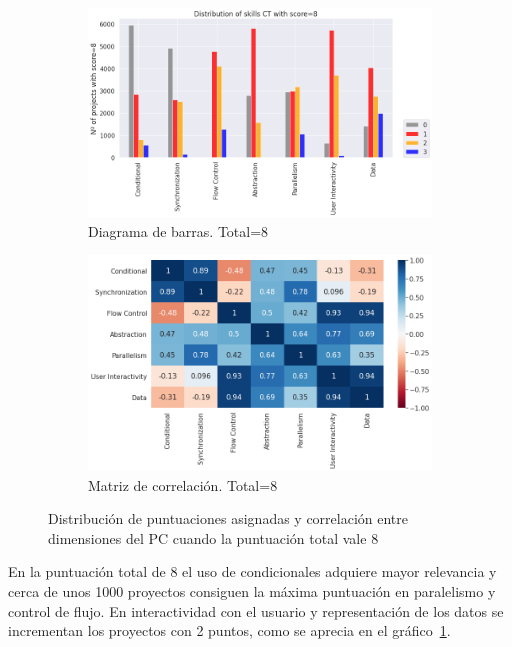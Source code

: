 \documentclass[a4paper, 12pt]{book}
\begin{document}
\begin{figure}[H]
    \centering
    \begin{subfigure}[h]{.49\textwidth} 
        \includegraphics[width=\textwidth]{img/distribucion_8_Snap}
        \caption{Diagrama de barras. Total=8}
        \label{fig:total8_Snap}
    \end{subfigure}       
    \begin{subfigure}[h]{.49\textwidth} 
        \includegraphics[width=\textwidth]{img/corr_8_Snap}
        \caption{Matriz de correlación. Total=8}
        \label{fig:corr8_Snap}
    \end{subfigure}
    \caption{Distribución de puntuaciones asignadas y correlación entre dimensiones del PC cuando la puntuación total vale 8}
\end{figure}

En la puntuación total de 8 el uso de condicionales adquiere mayor relevancia y cerca de unos 1000 proyectos consiguen la máxima puntuación en paralelismo y control de flujo. En interactividad con el usuario y representación de los datos se incrementan los proyectos con 2 puntos, como se aprecia en el gráfico~\ref{fig:total8_Snap}.
\end{document}
